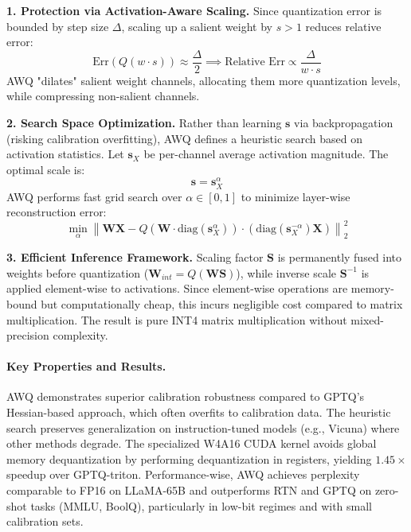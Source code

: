 \textbf{1. Protection via Activation-Aware Scaling.} Since quantization error is bounded by step size $\Delta$, scaling up a salient weight by $s > 1$ reduces relative error:
\begin{equation}
\text{Err}(Q(w \cdot s)) \approx \frac{\Delta}{2} \implies \text{Relative Err} \propto \frac{\Delta}{w \cdot s}
\end{equation}
AWQ "dilates" salient weight channels, allocating them more quantization levels, while compressing non-salient channels.

\textbf{2. Search Space Optimization.} Rather than learning $\bm{s}$ via backpropagation (risking calibration overfitting), AWQ defines a heuristic search based on activation statistics. Let $\bm{s}_X$ be per-channel average activation magnitude. The optimal scale is:
\begin{equation}
\bm{s} = \bm{s}_X^\alpha
\end{equation}
AWQ performs fast grid search over $\alpha \in [0, 1]$ to minimize layer-wise reconstruction error:
\begin{equation}
\min_{\alpha} \left\| \bm{W}\bm{X} - Q(\bm{W} \cdot \text{diag}(\bm{s}_X^\alpha)) \cdot (\text{diag}(\bm{s}_X^{-\alpha}) \bm{X}) \right\|_2^2
\end{equation}

\textbf{3. Efficient Inference Framework.} Scaling factor $\bm{S}$ is permanently fused into weights before quantization ($\bm{W}_{int} = Q(\bm{W}\bm{S})$), while inverse scale $\bm{S}^{-1}$ is applied element-wise to activations. Since element-wise operations are memory-bound but computationally cheap, this incurs negligible cost compared to matrix multiplication. The result is pure INT4 matrix multiplication without mixed-precision complexity.

\paragraph{Key Properties and Results.}
AWQ demonstrates superior calibration robustness compared to GPTQ's Hessian-based approach, which often overfits to calibration data. The heuristic search preserves generalization on instruction-tuned models (e.g., Vicuna) where other methods degrade. The specialized W4A16 CUDA kernel avoids global memory dequantization by performing dequantization in registers, yielding $1.45\times$ speedup over GPTQ-triton. Performance-wise, AWQ achieves perplexity comparable to FP16 on LLaMA-65B and outperforms RTN and GPTQ on zero-shot tasks (MMLU, BoolQ), particularly in low-bit regimes and with small calibration sets.

